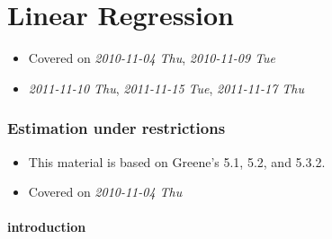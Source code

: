 
\part*{Linear Regression}%

\begin{itemize}
\item Covered on \textit{2010-11-04 Thu}, \textit{2010-11-09 Tue}
\item \textit{2011-11-10 Thu}, \textit{2011-11-15 Tue}, \textit{2011-11-17 Thu}
\end{itemize}
\section{Estimation under restrictions}
\label{sec-1}

\begin{itemize}
\item This material is based on Greene's 5.1, 5.2, and 5.3.2.
\item Covered on \textit{2010-11-04 Thu}
\end{itemize}
\subsection{introduction}
\label{sec-1-1}

